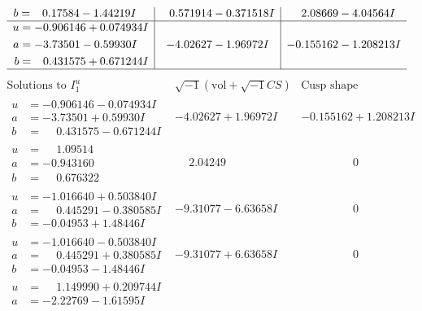 \documentclass[1p]{elsarticle_modified}
\theoremstyle{definition}
\newcommand{\I}{\sqrt{-1}}
\begin{document}
$$\begin{array}{c|c|c}
\begin{aligned}
b &= \phantom{-}0.17584 - 1.44219 I\end{aligned}
 & \phantom{-}0.571914 - 0.371518 I & \phantom{-}2.08669 - 4.04564 I \\ \hline\begin{aligned}
u &= -0.906146 + 0.074934 I \\
a &= -3.73501 - 0.59930 I \\
b &= \phantom{-}0.431575 + 0.671244 I\end{aligned}
 & -4.02627 - 1.96972 I & -0.155162 - 1.208213 I\\
 \hline 
 \end{array}$$\newpage$$\begin{array}{c|c|c}  
\text{Solutions to }I^u_{1}& \I (\text{vol} + \sqrt{-1}CS) & \text{Cusp shape}\\
 \hline 
\begin{aligned}
u &= -0.906146 - 0.074934 I \\
a &= -3.73501 + 0.59930 I \\
b &= \phantom{-}0.431575 - 0.671244 I\end{aligned}
 & -4.02627 + 1.96972 I & -0.155162 + 1.208213 I \\ \hline\begin{aligned}
u &= \phantom{-}1.09514\phantom{ +0.000000I} \\
a &= -0.943160\phantom{ +0.000000I} \\
b &= \phantom{-}0.676322\phantom{ +0.000000I}\end{aligned}
 & \phantom{-}2.04249\phantom{ +0.000000I} & \phantom{-0.000000 } 0 \\ \hline\begin{aligned}
u &= -1.016640 + 0.503840 I \\
a &= \phantom{-}0.445291 - 0.380585 I \\
b &= -0.04953 + 1.48446 I\end{aligned}
 & -9.31077 - 6.63658 I & \phantom{-0.000000 } 0 \\ \hline\begin{aligned}
u &= -1.016640 - 0.503840 I \\
a &= \phantom{-}0.445291 + 0.380585 I \\
b &= -0.04953 - 1.48446 I\end{aligned}
 & -9.31077 + 6.63658 I & \phantom{-0.000000 } 0 \\ \hline\begin{aligned}
u &= \phantom{-}1.149990 + 0.209744 I \\
a &= -2.22769 - 1.61595 I \\

\end{aligned}
\end{array}$$
\end{document}
